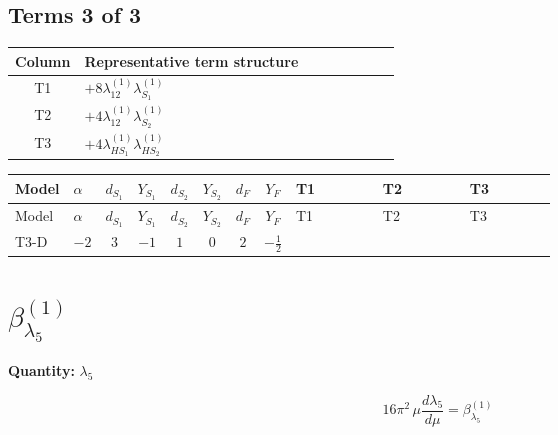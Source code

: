 \documentclass[8pt]{article}
\begin{document}
\begin{landscape}
\subsection*{Terms 3 of 3}
\begin{center}
\begin{tabular}{@{}c >{\raggedright\arraybackslash}p{0.82\linewidth}@{}}
\toprule
Column & Representative term structure \\
\midrule
T1 & \(\displaystyle +8 {\lambda_{12}^{(1)}} {\lambda_{S_1}^{(1)}}\) \\
\midrule
T2 & \(\displaystyle +4 {\lambda_{12}^{(1)}} {\lambda_{S_2}^{(1)}}\) \\
\midrule
T3 & \(\displaystyle +4 {\lambda_{HS_1}^{(1)}} {\lambda_{HS_2}^{(1)}}\) \\
\midrule
\bottomrule
\end{tabular}
\end{center}
\smallskip
\tiny
\begin{longtable}{@{}llcccccc >{\raggedright\arraybackslash}p{0.21\linewidth} >{\raggedright\arraybackslash}p{0.21\linewidth} >{\raggedright\arraybackslash}p{0.21\linewidth}@{}}
\toprule
Model & $\alpha$ & $d_{S_1}$ & $Y_{S_1}$ & $d_{S_2}$ & $Y_{S_2}$ & $d_F$ & $Y_F$ & T1 & T2 & T3 \\
\midrule
\endfirsthead
\toprule
Model & $\alpha$ & $d_{S_1}$ & $Y_{S_1}$ & $d_{S_2}$ & $Y_{S_2}$ & $d_F$ & $Y_F$ & T1 & T2 & T3 \\
\midrule
\endhead
T3-D & $-2$ & $3$ & $-1$ & $1$ & $0$ & $2$ & $-\frac{1}{2}$ & \scriptsize\adjustbox{max width=\linewidth}{$\begin{gathered} +8 {\lambda_{12}^{(1)}} {\lambda_{S_1}^{(1)}}\end{gathered}$} & \scriptsize\adjustbox{max width=\linewidth}{$\begin{gathered} +4 {\lambda_{12}^{(1)}} {\lambda_{S_2}^{(1)}}\end{gathered}$} & \scriptsize\adjustbox{max width=\linewidth}{$\begin{gathered} +4 {\lambda_{HS_1}^{(1)}} {\lambda_{HS_2}^{(1)}}\end{gathered}$} \\
\midrule
\bottomrule
\end{longtable}
\clearpage
\section*{$\beta_{\lambda_5}^{(1)}$}
\noindent\textbf{Quantity: }$\lambda_5$\par\smallskip
\[16\pi^2\,\mu\frac{d \lambda_5}{d\mu}=\beta_{\lambda_5}^{(1)}\]

\end{landscape}
\end{document}
